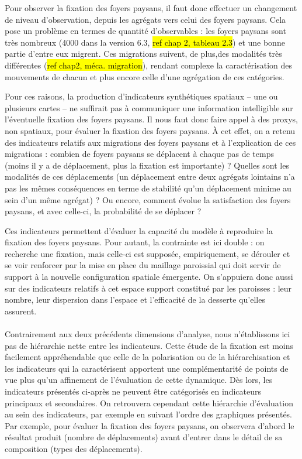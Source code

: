 Pour observer la fixation des foyers paysans, il faut donc effectuer un changement de niveau d'observation, depuis les agrégats vers celui des foyers paysans.
Cela pose un problème en termes de quantité d'observables :
les foyers paysans sont très nombreux (4000 dans la version 6.3, \hl{ref chap 2, tableau 2.3}) et une bonne partie d'entre eux migrent.
Ces migrations suivent, de plus,des modalités très différentes (\hl{ref chap2, méca. migration}), rendant complexe la caractérisation des mouvements de chacun et plus encore celle d'une agrégation de ces catégories.

Pour ces raisons, la production d'indicateurs synthétiques spatiaux -- une ou plusieurs cartes -- ne suffirait pas à communiquer une information intelligible sur l'éventuelle fixation des foyers paysans.
Il nous faut donc faire appel à des \og proxys\fg{}, non spatiaux, pour évaluer la fixation des foyers paysans.
À cet effet, on a retenu des indicateurs relatifs aux migrations des foyers paysans et à l'explication de ces migrations :
combien de foyers paysans se déplacent à chaque pas de temps (moins il y a de déplacement, plus la fixation est importante) ? Quelles sont les modalités de ces déplacements (un déplacement entre deux agrégats lointains n'a pas les mêmes conséquences en terme de stabilité qu'un déplacement minime au sein d'un même agrégat) ? Ou encore, comment évolue la satisfaction des foyers paysans, et avec celle-ci, la probabilité de se déplacer ?

Ces indicateurs permettent d'évaluer la capacité du modèle à reproduire la fixation des foyers paysans.
Pour autant, la contrainte est ici double :
on recherche une fixation, mais celle-ci est supposée, empiriquement, se dérouler et se voir renforcer par la mise en place du maillage paroissial qui doit servir de support à la nouvelle configuration spatiale émergente.
On s'appuiera donc aussi sur des indicateurs relatifs à cet espace support constitué par les paroisses :
leur nombre, leur dispersion dans l'espace et l'efficacité de la desserte qu'elles assurent.

\paragraph*{}
Contrairement aux deux précédents dimensions d'analyse, nous n'établissons ici pas de hiérarchie nette entre les indicateurs.
Cette étude de la fixation est moins facilement appréhendable que celle de la polarisation ou de la hiérarchisation et les indicateurs qui la caractérisent apportent une complémentarité de points de vue plus qu'un affinement de l'évaluation de cette dynamique.
Dès lors, les indicateurs présentés ci-après ne peuvent être catégorisés en indicateurs principaux et secondaires.
On retrouvera cependant cette hiérarchie d'évaluation au sein des indicateurs, par exemple en suivant l'ordre des graphiques présentés.
Par exemple, pour évaluer la fixation des foyers paysans, on observera d'abord le résultat produit (nombre de déplacements) avant d'entrer dans le détail de sa composition (types des déplacements).

